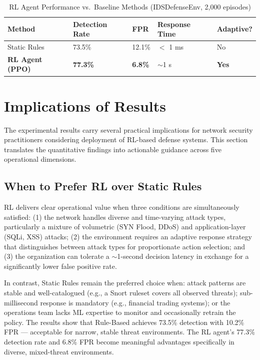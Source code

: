 \documentclass[12pt,a4paper]{report}
\begin{document}
\begin{table}[h!]
\centering
\caption{RL Agent Performance vs.\ Baseline Methods (IDSDefenseEnv, 2,000 episodes)}
\begin{tabular}{L{3cm} C{2.5cm} C{2.5cm} C{3cm} L{2.5cm}}
\toprule
\textbf{Method} & \textbf{Detection Rate} & \textbf{FPR} & \textbf{Response Time} & \textbf{Adaptive?} \\
\midrule
Static Rules & 73.5\% & 12.1\% & $<$ 1 ms & No \\
\textbf{RL Agent (PPO)} & \textbf{77.3\%} & \textbf{6.8\%} & $\sim$1 s & \textbf{Yes} \\
\bottomrule
\end{tabular}
\end{table}

\section{Implications of Results}

The experimental results carry several practical implications for network security practitioners considering deployment of RL-based defense systems. This section translates the quantitative findings into actionable guidance across five operational dimensions.

\subsection{When to Prefer RL over Static Rules}

RL delivers clear operational value when three conditions are simultaneously satisfied: (1) the network handles diverse and time-varying attack types, particularly a mixture of volumetric (SYN Flood, DDoS) and application-layer (SQLi, XSS) attacks; (2) the environment requires an adaptive response strategy that distinguishes between attack types for proportionate action selection; and (3) the organization can tolerate a $\sim$1-second decision latency in exchange for a significantly lower false positive rate.

In contrast, Static Rules remain the preferred choice when: attack patterns are stable and well-catalogued (e.g., a Snort ruleset covers all observed threats); sub-millisecond response is mandatory (e.g., financial trading systems); or the operations team lacks ML expertise to monitor and occasionally retrain the policy. The results show that Rule-Based achieves 73.5\% detection with 10.2\% FPR --- acceptable for narrow, stable threat environments. The RL agent's 77.3\% detection rate and 6.8\% FPR become meaningful advantages specifically in diverse, mixed-threat environments.
\end{document}
